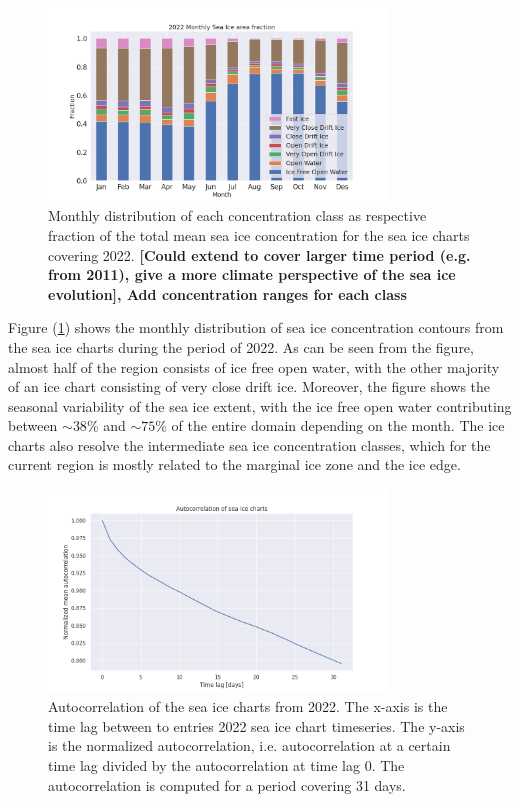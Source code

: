 \documentclass[../main/thesis.tex]{subfiles}
\begin{document}
\begin{figure}
    \centering
    \includegraphics[width=0.8\textwidth]{2022-sic-distribution}
    \caption{\label{fig:2022-areadist-sic}Monthly distribution of each concentration class as respective fraction of the total mean sea ice concentration for the sea ice charts covering 2022. \textbf{[Could extend to cover larger time period (e.g. from 2011), give a more climate perspective of the sea ice evolution], Add concentration ranges for each class}}
\end{figure}

Figure (\ref{fig:2022-areadist-sic}) shows the monthly distribution of sea ice concentration contours from the sea ice charts during the period of 2022. As can be seen from the figure, almost half of the region consists of ice free open water, with the other majority of an ice chart consisting of very close drift ice. Moreover, the figure shows the seasonal variability of the sea ice extent, with the ice free open water contributing between $\sim38$\% and $\sim75$\% of the entire domain depending on the month. The ice charts also resolve the intermediate sea ice concentration classes, which for the current region is mostly related to the marginal ice zone and the ice edge.

\begin{figure}
    \centering
    \includegraphics[width = 0.8\textwidth]{autocorr_icechart}
    \caption{\label{fig:autocorr}Autocorrelation of the sea ice charts from 2022. The x-axis is the time lag between to entries 2022 sea ice chart timeseries. The y-axis is the normalized autocorrelation, i.e. autocorrelation at a certain time lag divided by the autocorrelation at time lag 0. The autocorrelation is computed for a period covering 31 days.}
\end{figure}
\end{document}
